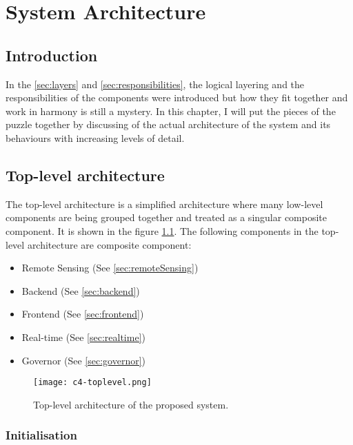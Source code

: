 \documentclass[../thesis.tex]{subfiles}
\begin{document}
\chapter{System Architecture}

\section{Introduction}

In the \autoref{sec:layers} and \autoref{sec:responsibilities}, the logical layering and the responsibilities of the components were introduced but how they fit together and work in harmony is still a mystery. In this chapter, I will put the pieces of the puzzle together by discussing of the actual architecture of the system and its behaviours with increasing levels of detail. 


\section{Top-level architecture}

The top-level architecture is a simplified architecture where many low-level components are being grouped together and treated as a singular composite component. It is shown in the figure \ref{fig:toplevel}. The following components in the top-level architecture are composite component:

\begin{itemize}
	\item Remote Sensing (See \autoref{sec:remoteSensing})
	\item Backend (See \autoref{sec:backend})
	\item Frontend (See \autoref{sec:frontend})
	\item Real-time (See \autoref{sec:realtime})
	\item Governor (See \autoref{sec:governor})
\end{itemize}

\begin{figure}[!ht]
	\centering
	\texttt{[image: c4-toplevel.png]}
	\caption{Top-level architecture of the proposed system.}
	\label{fig:toplevel}
\end{figure}
\restoregeometry

\subsection{Initialisation}
\end{document}
